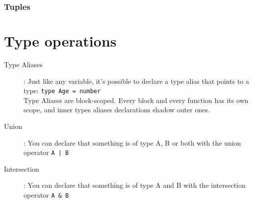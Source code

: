 \documentclass[french]{article}
\begin{document}
\subsubsection{Tuples}

\section{Type operations}

\begin{description}
  \item[Type Aliases]: Just like any variable, it's possible to declare a type alias that points to a type: \lstinline{type Age = number} \\
    Type Aliases are block-scoped. Every block and every function has its own scope, and inner types aliases declarations shadow outer ones.
  \item[Union]: You can declare that something is of type A, B or both with the union operator \lstinline{A | B} 
  \item[Intersection]: You can declare that something is of type A and B with the intersection operator \lstinline{A & B} 
\end{description}
\end{document}
